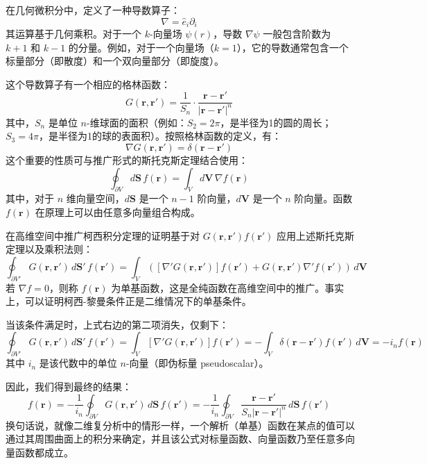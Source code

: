 在几何微积分中，定义了一种导数算子：
$$
\nabla = \hat{e}_i \partial_i~
$$
其运算基于几何乘积。对于一个 $k$-向量场 $\psi(r)$，导数 $\nabla \psi$ 一般包含阶数为 $k+1$ 和 $k-1$ 的分量。例如，对于一个向量场（$k = 1$），它的导数通常包含一个标量部分（即散度）和一个双向量部分（即旋度）。

这个导数算子有一个相应的格林函数：
$$
G(\mathbf{r}, \mathbf{r}') = \frac{1}{S_n} \cdot \frac{\mathbf{r} - \mathbf{r}'}{|\mathbf{r} - \mathbf{r}'|^n}~
$$
其中，$S_n$ 是单位 $n$-维球面的面积（例如：$S_2 = 2\pi$，是半径为1的圆的周长；$S_3 = 4\pi$，是半径为1的球的表面积）。按照格林函数的定义，有：
$$
\nabla G(\mathbf{r}, \mathbf{r}') = \delta(\mathbf{r} - \mathbf{r}')~
$$
这个重要的性质可与推广形式的斯托克斯定理结合使用：
$$
\oint_{\partial V} d\mathbf{S} \, f(\mathbf{r}) = \int_V d\mathbf{V} \, \nabla f(\mathbf{r})~
$$
其中，对于 $n$ 维向量空间，$d\mathbf{S}$ 是一个 $n-1$ 阶向量，$d\mathbf{V}$ 是一个 $n$ 阶向量。函数 $f(\mathbf{r})$ 在原理上可以由任意多向量组合构成。

在高维空间中推广柯西积分定理的证明基于对 $G(\mathbf{r}, \mathbf{r}') f(\mathbf{r}')$ 应用上述斯托克斯定理以及乘积法则：
$$
\oint_{\partial V'} G(\mathbf{r}, \mathbf{r}') \, d\mathbf{S}' \, f(\mathbf{r}') = \int_V \left( [\nabla' G(\mathbf{r}, \mathbf{r}')] f(\mathbf{r}') + G(\mathbf{r}, \mathbf{r}') \nabla' f(\mathbf{r}') \right) \, d\mathbf{V}~
$$
若 $\nabla f = 0$，则称 $f(\mathbf{r})$ 为单基函数，这是全纯函数在高维空间中的推广。事实上，可以证明柯西-黎曼条件正是二维情况下的单基条件。

当该条件满足时，上式右边的第二项消失，仅剩下：
$$
\oint_{\partial V'} G(\mathbf{r}, \mathbf{r}') \, d\mathbf{S}' \, f(\mathbf{r}') = \int_V [\nabla' G(\mathbf{r}, \mathbf{r}')] f(\mathbf{r}') = -\int_V \delta(\mathbf{r} - \mathbf{r}') f(\mathbf{r}') \, d\mathbf{V} = -i_n f(\mathbf{r})~
$$
其中 $i_n$ 是该代数中的单位 $n$-向量（即伪标量 pseudoscalar）。

因此，我们得到最终的结果：
$$
f(\mathbf{r}) = -\frac{1}{i_n} \oint_{\partial V} G(\mathbf{r}, \mathbf{r}') \, d\mathbf{S} \, f(\mathbf{r}') = -\frac{1}{i_n} \oint_{\partial V} \frac{\mathbf{r} - \mathbf{r}'}{S_n |\mathbf{r} - \mathbf{r}'|^n} \, d\mathbf{S} \, f(\mathbf{r}')~
$$
换句话说，就像二维复分析中的情形一样，一个解析（单基）函数在某点的值可以通过其周围曲面上的积分来确定，并且该公式对标量函数、向量函数乃至任意多向量函数都成立。
